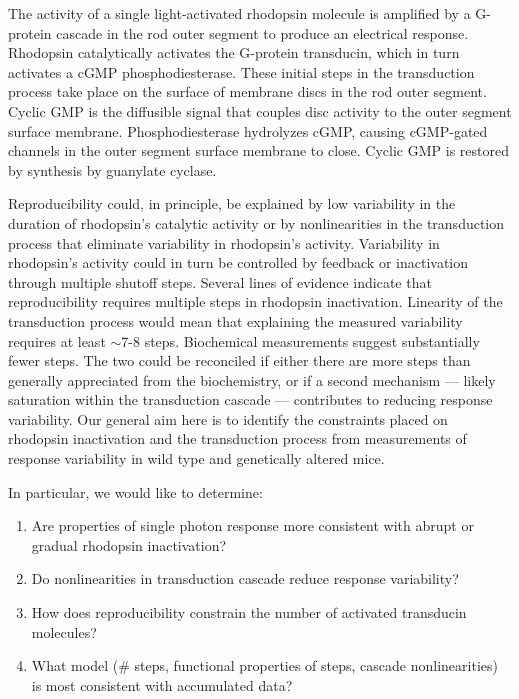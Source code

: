 \documentclass[12pt]{article}
\def\i{\item}
\def\be{\begin{enumerate}}
\def\ee{\end{enumerate}}
\def\GCAPKO{GCAP$^{-/-}$}
\def\GCAPHET{GCAP$^{+/-}$}
\def\RKHET{GRK1$^{+/-}$}
\begin{document}
The activity of a single light-activated rhodopsin molecule is amplified by a G-protein cascade in the rod outer segment to produce an electrical response.  Rhodopsin catalytically activates the G-protein transducin, which in turn activates a cGMP phosphodiesterase.  These initial steps in the transduction process take place on the surface of membrane discs in the rod outer segment.  Cyclic GMP is the diffusible signal that couples disc activity to the outer segment surface membrane.  Phosphodiesterase hydrolyzes cGMP, causing cGMP-gated channels in the outer segment surface membrane to close.  Cyclic GMP is restored by synthesis by guanylate cyclase.

Reproducibility could, in principle, be explained by low variability in the duration of rhodopsin's catalytic activity or by nonlinearities in the transduction process that eliminate variability in rhodopsin's activity.  Variability in rhodopsin's activity could in turn be controlled by feedback or inactivation through multiple shutoff steps.  Several lines of evidence indicate that reproducibility requires multiple steps in rhodopsin inactivation.  Linearity of the transduction process would mean that explaining the measured variability requires at least $\sim$7-8 steps. Biochemical measurements suggest substantially fewer steps.  The two could be reconciled if either there are more steps than generally appreciated from the biochemistry, or if a second mechanism --- likely saturation within the transduction cascade --- contributes to reducing response variability.  Our general aim here is to identify the constraints placed on rhodopsin inactivation and the transduction process from measurements of response variability in wild type and genetically altered mice. 

In particular, we would like to determine:

\be

\i{Are properties of single photon response more consistent with abrupt or gradual rhodopsin inactivation?}

\i{Do nonlinearities in transduction cascade reduce response variability?}

\i{How does reproducibility constrain the number of activated transducin molecules?}

\i{What model (\# steps, functional properties of steps, cascade nonlinearities) is most consistent with accumulated data?}

\ee

\end{document}
